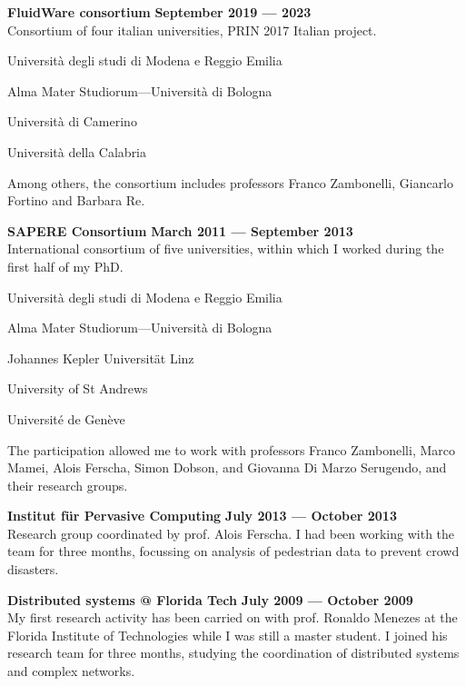 \halfblankline{}

\textbf{FluidWare consortium} \hfill \textbf{September 2019 --- 2023}\\
Consortium of four italian universities, PRIN 2017 Italian project.
\begin{innerlist}
    \item Università degli studi di Modena e Reggio Emilia
    \item Alma Mater Studiorum---Università di Bologna
    \item Università di Camerino
    \item Università della Calabria
\end{innerlist}
Among others, the consortium includes professors Franco Zambonelli, Giancarlo Fortino and Barbara Re.

\halfblankline{}

\textbf{SAPERE Consortium} \hfill \textbf{March 2011 --- September 2013}\\
International consortium of five universities, within which I worked during the first half of my PhD.
\begin{innerlist}
    \item Università degli studi di Modena e Reggio Emilia
    \item Alma Mater Studiorum---Università di Bologna
    \item Johannes Kepler Universität Linz
    \item University of St Andrews
    \item Université de Genève
\end{innerlist}
The participation allowed me to work with professors Franco Zambonelli, Marco Mamei, Alois Ferscha, Simon Dobson, and Giovanna Di Marzo Serugendo, and their research groups.

\halfblankline{}

\textbf{Institut für Pervasive Computing} \hfill \textbf{July 2013 --- October 2013}\\
Research group coordinated by prof. Alois Ferscha. I had been working with the team for three months, focussing on analysis of pedestrian data to prevent crowd disasters.

\halfblankline{}

\textbf{Distributed systems @ Florida Tech} \hfill \textbf{July 2009 --- October 2009}\\
My first research activity has been carried on with prof. Ronaldo Menezes at the Florida Institute of Technologies while I was still a master student. I joined his research team for three months, studying the coordination of distributed systems and complex networks.

\halfblankline{}
